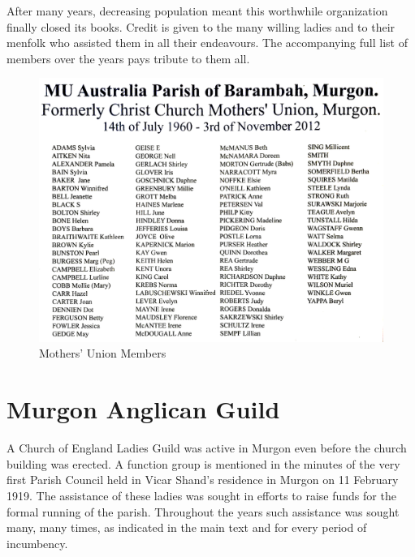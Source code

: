 After many years, decreasing population meant this worthwhile organization finally closed its books. Credit is given to the many willing ladies and to their menfolk who assisted them in all their endeavours. The accompanying full list of members over the years pays tribute to them all.









\begin{figure}[!htb]
\begin{center}
\includegraphics[width=1.\textwidth,center]{../images/MothersUnionNames.jpg}
\caption{Mothers' Union Members}
\end{center}
\end{figure}




\section{Murgon Anglican Guild}



A Church of England Ladies Guild was active in Murgon even before the church building was erected. A function group is mentioned in the minutes of the very first Parish Council held in Vicar Shand's residence in Murgon on 11 February 1919. The assistance of these ladies was sought in efforts to raise funds for the formal running of the parish. Throughout the years such assistance was sought many, many times, as indicated in the main text and for every period of incumbency.




